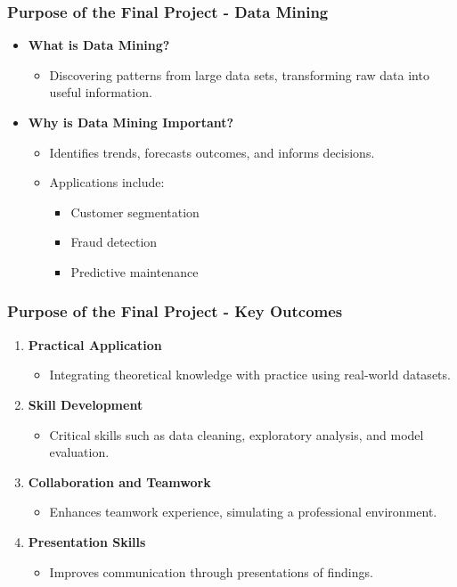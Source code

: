 \documentclass[aspectratio=169]{beamer}
\begin{document}
\begin{frame}[fragile]
    \frametitle{Purpose of the Final Project - Data Mining}
    \begin{itemize}
        \item \textbf{What is Data Mining?}
            \begin{itemize}
                \item Discovering patterns from large data sets, transforming raw data into useful information.
            \end{itemize}
        \item \textbf{Why is Data Mining Important?}
            \begin{itemize}
                \item Identifies trends, forecasts outcomes, and informs decisions.
                \item Applications include:
                    \begin{itemize}
                        \item Customer segmentation
                        \item Fraud detection
                        \item Predictive maintenance
                    \end{itemize}
            \end{itemize}
    \end{itemize}
\end{frame}

\begin{frame}[fragile]
    \frametitle{Purpose of the Final Project - Key Outcomes}
    \begin{enumerate}
        \item \textbf{Practical Application}
            \begin{itemize}
                \item Integrating theoretical knowledge with practice using real-world datasets.
            \end{itemize}
        \item \textbf{Skill Development}
            \begin{itemize}
                \item Critical skills such as data cleaning, exploratory analysis, and model evaluation.
            \end{itemize}
        \item \textbf{Collaboration and Teamwork}
            \begin{itemize}
                \item Enhances teamwork experience, simulating a professional environment.
            \end{itemize}
        \item \textbf{Presentation Skills}
            \begin{itemize}
                \item Improves communication through presentations of findings.
            \end{itemize}
    \end{enumerate}
\end{frame}
\end{document}
